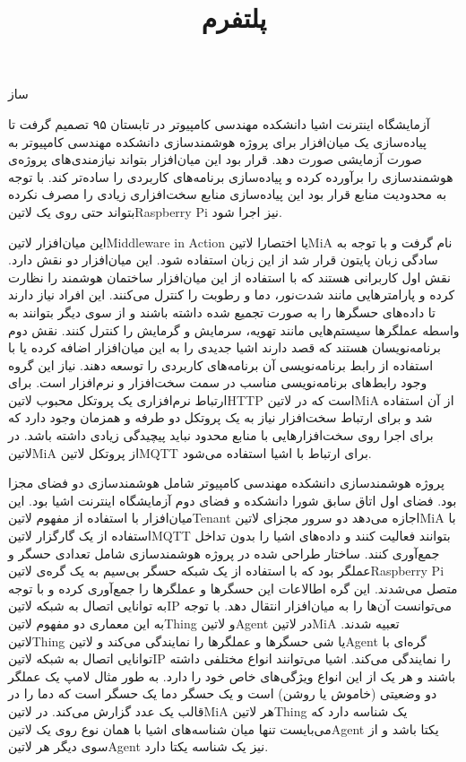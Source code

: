 \documentclass[]{assignment}
\title{پلتفرم}
\begin{document}
‌ساز

آزمایشگاه اینترنت اشیا دانشکده مهندسی کامپیوتر در تابستان ۹۵ تصمیم گرفت تا پیاده‌سازی یک میان‌افزار برای پروژه هوشمند‌سازی دانشکده مهندسی کامپیوتر به صورت آزمایشی صورت دهد.
قرار بود این میان‌افزار بتواند نیازمندی‌های پروژه‌ی هوشمندسازی را برآورده کرده و پیاده‌سازی برنامه‌های کاربردی را ساده‌تر کند. با توجه به محدودیت منابع قرار بود این پیاده‌سازی منابع سخت‌افزاری
زیادی را مصرف نکرده بتواند حتی روی یک ‌لاتین{Raspberry Pi} نیز اجرا شود.

این میان‌افزار ‌لاتین{Middleware in Action} یا اختصارا ‌لاتین{MiA} نام گرفت و
با توجه به سادگی زبان پایتون قرار شد از این زبان استفاده شود.
این میان‌افزار دو نقش دارد. نقش اول کاربرانی هستند که با استفاده از این میان‌افزار ساختمان هوشمند را نظارت کرده و پارامترهایی مانند شدت‌نور،
دما و رطوبت را کنترل می‌کنند. این افراد نیاز دارند تا داده‌های حسگرها را به صورت تجمیع شده داشته باشند و از سوی دیگر بتوانند به واسطه عملگرها سیستم‌هایی مانند
تهویه، سرمایش و گرمایش را کنترل کنند.
نقش دوم برنامه‌نویسان هستند که قصد دارند اشیا جدیدی را به این میان‌افزار اضافه کرده یا با استفاده از رابط برنامه‌نویسی آن برنامه‌های کاربردی را توسعه دهند.
نیاز این گروه وجود رابط‌های برنامه‌نویسی مناسب در سمت سخت‌افزار و نرم‌افزار است. برای ارتباط نرم‌افزاری یک پروتکل محبوب ‌لاتین{HTTP} است که در
‌لاتین{MiA} از آن استفاده شد و برای ارتباط سخت‌افزار نیاز به یک پروتکل دو طرفه و همزمان وجود دارد که برای اجرا روی سخت‌افزارهایی با
منابع محدود نباید پیچیدگی زیادی داشته باشد. در ‌لاتین{MiA} از پروتکل ‌لاتین{MQTT} برای ارتباط با اشیا استفاده می‌شود.

پروژه هوشمند‌سازی دانشکده مهندسی کامپیوتر شامل هوشمند‌سازی دو فضای مجزا بود. فضای اول اتاق سابق شورا دانشکده و فضای دوم آزمایشگاه اینترنت اشیا بود.
این میان‌افزار با استفاده از مفهوم ‌لاتین{Tenant} اجازه می‌دهد دو سرور مجزای ‌لاتین{MiA} با استفاده از یک گارگزار ‌لاتین{MQTT}
بتوانند فعالیت کنند و داده‌های اشیا را بدون تداخل جمع‌آوری کنند.
ساختار طراحی شده در پروژه هوشمند‌سازی شامل تعدادی حسگر و عملگر بود که با استفاده از یک شبکه حسگر بی‌سیم به یک گره‌ی ‌لاتین{Raspberry Pi}
متصل می‌شدند. این گره اطالاعات این حسگرها و عملگرها را جمع‌آوری کرده و با توجه به توانایی اتصال به شبکه ‌لاتین{IP} می‌توانست آن‌ها را به میان‌افزار انتقال دهد.
با توجه به این معماری دو مفهوم ‌لاتین{Thing} و ‌لاتین{Agent} در ‌لاتین{MiA} تعبیه شدند. ‌لاتین{Thing} یا شی حسگرها و عملگرها را نمایندگی می‌کند
و ‌لاتین{Agent} گره‌ای با توانایی اتصال به شبکه ‌لاتین{IP} را نمایندگی می‌کند.
اشیا می‌توانند انواع مختلفی داشته باشند و هر یک از این انواع ویژگی‌های خاص خود را دارد. به طور مثال لامپ یک عملگر دو وضعیتی (خاموش یا روشن)
است و یک حسگر دما یک حسگر است که دما را در قالب یک عدد گزارش می‌کند.
در ‌لاتین{MiA} هر ‌لاتین{Thing} یک شناسه دارد که می‌بایست تنها میان شناسه‌های اشیا با همان نوع روی یک ‌لاتین{Agent} یکتا باشد و از سوی دیگر هر ‌لاتین{Agent} نیز یک شناسه
یکتا دارد.
\end{document}
